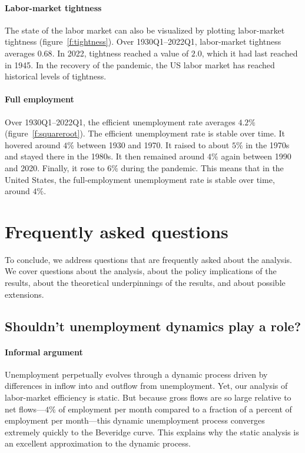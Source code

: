 \documentclass[letterpaper,12pt,leqno]{article}
\begin{document}
\paragraph{Labor-market tightness} The state of the labor market can also be visualized by plotting labor-market tightness (figure~\ref{f:tightness}). Over 1930Q1--2022Q1, labor-market tightness averages $0.68$. In 2022, tightness reached a value of $2.0$, which it had last reached in 1945. In the recovery of the pandemic, the US labor market has reached historical levels of tightness.

\paragraph{Full employment} Over 1930Q1--2022Q1, the efficient unemployment rate averages $4.2\%$ (figure~\ref{f:squareroot}). The efficient unemployment rate is stable over time. It hovered around $4\%$ between 1930 and 1970. It raised to about $5\%$ in the 1970s and stayed there in the 1980s. It then remained around $4\%$ again between 1990 and 2020. Finally, it rose to $6\%$ during the pandemic. This means that in the United States, the full-employment unemployment rate is stable over time, around $4\%$. 

\section{Frequently asked questions}\label{s:faq}

To conclude, we address questions that are frequently asked about the analysis. We cover questions about the analysis, about the policy implications of the results, about the theoretical underpinnings of the results, and about possible extensions.

\subsection{Shouldn't unemployment dynamics play a role?}

\paragraph{Informal argument} Unemployment perpetually evolves through a dynamic process driven by differences in inflow into and outflow from unemployment. Yet, our analysis of labor-market efficiency is static. But because gross flows are so large relative to net flows---$4\%$ of employment per month compared to a fraction of a percent of employment per month---this dynamic unemployment process converges extremely quickly to the Beveridge curve. This explains why the static analysis is an excellent approximation to the dynamic process.
\end{document}
